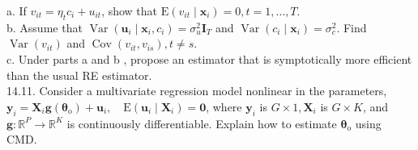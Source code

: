 \documentclass[10pt]{article}
\begin{document}
a. If $v_{i t}=\eta_{t} c_{i}+u_{i t}$, show that $\mathrm{E}\left(v_{i t} \mid \mathbf{x}_{i}\right)=0, t=1, \ldots, T$.\\
b. Assume that $\operatorname{Var}\left(\mathbf{u}_{i} \mid \mathbf{x}_{i}, c_{i}\right)=\sigma_{u}^{2} \mathbf{I}_{T}$ and $\operatorname{Var}\left(c_{i} \mid \mathbf{x}_{i}\right)=\sigma_{c}^{2}$. Find $\operatorname{Var}\left(v_{i t}\right)$ and $\operatorname{Cov}\left(v_{i t}, v_{i s}\right), t \neq s$.\\
c. Under parts a and b , propose an estimator that is symptotically more efficient than the usual RE estimator.\\
14.11. Consider a multivariate regression model nonlinear in the parameters, $\mathbf{y}_{i}=\mathbf{X}_{i} \mathbf{g}\left(\boldsymbol{\theta}_{\mathrm{o}}\right)+\mathbf{u}_{i}, \quad \mathrm{E}\left(\mathbf{u}_{i} \mid \mathbf{X}_{i}\right)=\mathbf{0}$, where $\mathbf{y}_{i}$ is $G \times 1, \mathbf{X}_{i}$ is $G \times K$, and $\mathbf{g}: \mathbb{R}^{P} \rightarrow \mathbb{R}^{K}$ is continuously differentiable. Explain how to estimate $\boldsymbol{\theta}_{\mathrm{o}}$ using CMD.
\end{document}
